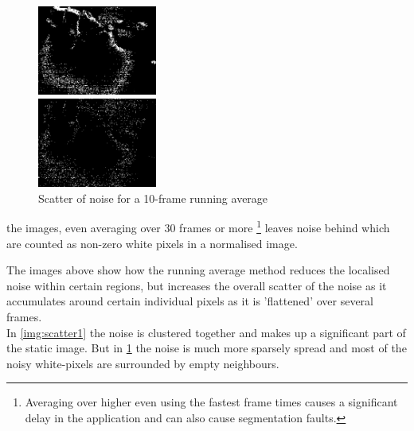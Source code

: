 \documentclass[11pt]{article} %
\begin{document}
\begin{figure}
	\vspace{-40pt}
	\begin{center}
		\includegraphics[width=0.35\textwidth]{../images/scatter1}
	\end{center}
	\vspace{-30pt}
	\caption{Scatter of noise for a 1-frame running average}\label{img:scatter1}
	\vspace{10pt}
	\begin{center}
		\includegraphics[width=0.35\textwidth]{../images/scatter2}
	\end{center}
	\vspace{-20pt}
	\caption{Scatter of noise for a 10-frame running average}\label{img:scatter2}
	\vspace{-20pt}
\end{figure}

the images, even averaging over 30 frames or more \footnote{Averaging over higher even using the fastest frame times causes a significant delay in the application and can also cause segmentation faults.}
leaves noise behind which are counted as non-zero white pixels in a normalised image.

The images above show how the running average method reduces the localised noise within certain regions, but increases the overall scatter of the noise as it accumulates around certain individual pixels as it is 'flattened' over several frames.\\\linebreak
\pagebreak In \cref{img:scatter1} the noise is clustered together and makes up a significant part of the static image. But in \cref{img:scatter2} the noise is much more sparsely spread and most of the noisy white-pixels are surrounded by empty neighbours.\\
\end{document}
